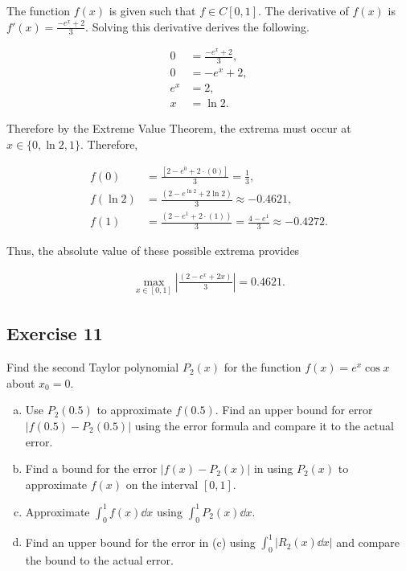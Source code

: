 \documentclass[a4paper, 10pt]{article}
\newenvironment{answer}[1][Answer]{\begin{trivlist}
\item[\hskip\labelsep{\textit{#1.}}]}{\end{trivlist}}
\begin{document}
\begin{answer}
	The function $f(x)$ is given such that $f\in C[0,1]$. The derivative of $f(x)$ is $f'(x) = \frac{- e^x + 2}{3}$. Solving this derivative derives the following. 

	\begin{align*}
		0 &= \frac{- e^x + 2}{3},\\
		0 &= - e^x + 2,\\
		e^x &= 2,\\
		x &= \ln{2}.
	\end{align*}

	Therefore by the Extreme Value Theorem, the extrema must occur at $x\in \{ 0, \ln{2}, 1 \}$. Therefore,

	\begin{align*}
		f(0) &= \frac{[2 - e^0 + 2\cdot (0)]}{3} = \frac{1}{3},\\
		f(\ln{2}) &= \frac{(2 - e^{\ln{2}} + 2\ln{2})}{3} \approx - 0.4621,\\ 
		f(1) &= \frac{(2 - e^1 + 2\cdot (1))}{3} = \frac{4 -e^1}{3} \approx - 0.4272.
	\end{align*}

	Thus, the absolute value of these possible extrema provides 

	\begin{align*}
		\max_{x\in [0,1]} \left| \frac{(2 - e^x + 2x)}{3} \right| = 0.4621.
	\end{align*}
\end{answer}

\subsection{Exercise 11}

Find the second Taylor polynomial $P_2(x)$ for the function $f(x)=e^x \cos{x}$ about $x_0 = 0$.

\begin{enumerate}[(a)]
	\item Use $P_2(0.5)$ to approximate $f(0.5)$. Find an upper bound for error $\left| f(0.5) - P_2(0.5) \right|$ using the error formula and compare it to the actual error.
	\item Find a bound for the error $\left| f(x) - P_2(x) \right|$ in using $P_2(x)$ to approximate $f(x)$ on the interval $[0,1]$.
	\item Approximate $\int_0^1 f(x) \dd{x}$ using $\int_0^1 P_2(x) \dd{x}$.
	\item Find an upper bound for the error in (c) using $\int_0^1 \left| R_2(x) \dd{x} \right|$ and compare the bound to the actual error.
\end{enumerate}
\end{document}
